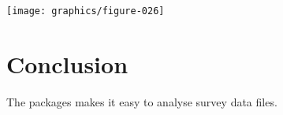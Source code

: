 \documentclass[10pt,oneside]{article}
\begin{document}
\begin{Schunk}
\end{Schunk}
\texttt{[image: graphics/figure-026]}


\section{Conclusion}

The \surveyor{} packages makes it easy to analyse survey data files.

\end{document}
